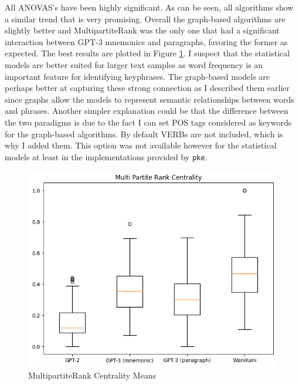 All ANOVAS's have been highly significant. As can be seen, all algorithms show a similar trend that is very promising. Overall the graph-based algorithms are slightly better and MultipartiteRank was the only one that had a significant interaction between GPT-3 mnemonics and paragraphs, favoring the former as expected. The best results are plotted in Figure \ref{figure:mpr_centrality}. I suspect that the statistical models are better suited for larger text samples as word frequency is an important feature for identifying keyphrases. The graph-based models are perhaps better at capturing these strong connection as I described them earlier since graphs allow the models to represent semantic relationships between words and phrases. Another simpler explanation could be that the difference between the two paradigms is due to the fact I can set POS tags considered as keywords for the graph-based algorithms. By default VERBs are not included, which is why I added them. This option was not available however for the statistical models at least in the implementations provided by \texttt{pke}. 
\begin{figure}
    \centering
    \includegraphics[width=400pt]{resources/mpr_centrality.png}
    \caption{MultipartiteRank Centrality Means}
    \label{figure:mpr_centrality}
\end{figure}

